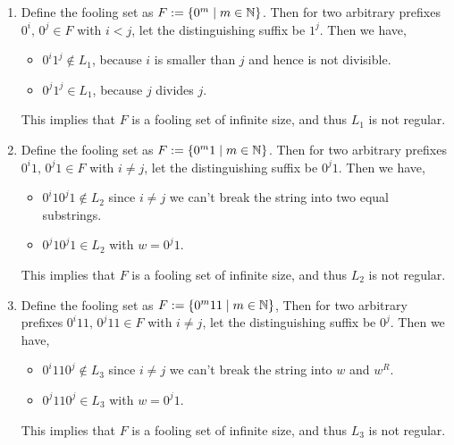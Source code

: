 \documentclass[12pt]{article}
\begin{document}
\begin{solution}
    \bbni 
    \begin{enumerate}
        \item Define the fooling set as $F := \{0^m \mid m \in \mathbb N\}$.  Then for two arbitrary prefixes $0^i, \, 0^j \in F$ with $i < j$, let the distinguishing suffix be $1^j$.  Then we have, 
        \begin{itemize}
            \item $0^i1^j \notin L_1$, because $i$ is smaller than $j$ and hence is not divisible. 
            \item $0^j1^j \in  L_1$, because $j$ divides $j$. 
        \end{itemize}
        This implies that $F$ is a fooling set of infinite size, and thus $L_1$ is not regular.

        \item Define the fooling set as $F := \{0^m1 \mid m \in \mathbb N\}$.  Then for two arbitrary prefixes $0^i1, \, 0^j1 \in F$ with $i \neq j$, let the distinguishing suffix be $0^j1$.  Then we have, 
        \begin{itemize}
            \item $0^i10^j1 \notin L_2$ since $i \neq j$ we can't break the string into two equal substrings. 
            \item $0^j10^j1 \in L_2$ with $w = 0^j1$. 
        \end{itemize}
        This implies that $F$ is a fooling set of infinite size, and thus $L_2$ is not regular.

        \item Define the fooling set as  $F:= \{0^m11 \mid m \in \mathbb N\}$, Then for two arbitrary prefixes $0^i11, \, 0^j11 \in F$ with $i \neq j$, let the distinguishing suffix be $0^j$.  Then we have,
         \begin{itemize}
            \item $0^i110^j \notin L_3$ since $i \neq j$ we can't break the string into $w$ and $w^R$. 
            \item $0^j110^j \in  L_3$ with $w = 0^j1$.  
        \end{itemize}
        This implies that $F$ is a fooling set of infinite size, and thus $L_3$ is not regular.
    \end{enumerate}
\end{solution}
\end{document}

